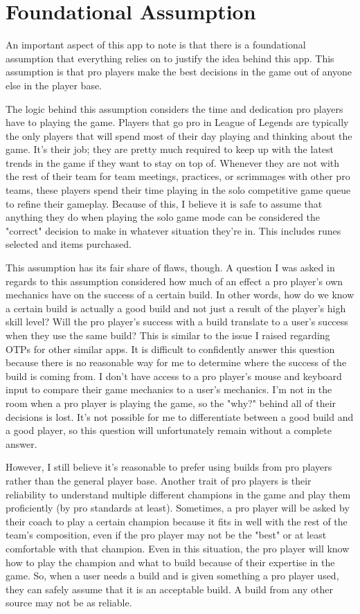 \documentclass[10pt,twocolumn]{article}
\begin{document}
\section{Foundational Assumption}
An important aspect of this app to note is that there is a foundational assumption that everything relies on to justify the idea behind this app.
This assumption is that pro players make the best decisions in the game out of anyone else in the player base.

The logic behind this assumption considers the time and dedication pro players have to playing the game.
Players that go pro in League of Legends are typically the only players that will spend most of their day playing and thinking about the game\cite{KSLNewsFPX}.
It's their job; they are pretty much required to keep up with the latest trends in the game if they want to stay on top of.
Whenever they are not with the rest of their team for team meetings, practices, or scrimmages with other pro teams, these players spend their time playing in the solo competitive game queue to refine their gameplay.
Because of this, I believe it is safe to assume that anything they do when playing the solo game mode can be considered the "correct" decision to make in whatever situation they're in.
This includes runes selected and items purchased.

This assumption has its fair share of flaws, though.
A question I was asked in regards to this assumption considered how much of an effect a pro player's own mechanics have on the success of a certain build.
In other words, how do we know a certain build is actually a good build and not just a result of the player's high skill level?
Will the pro player's success with a build translate to a user's success when they use the same build?
This is similar to the issue I raised regarding OTPs for other similar apps.
It is difficult to confidently answer this question because there is no reasonable way for me to determine where the success of the build is coming from.
I don't have access to a pro player's mouse and keyboard input to compare their game mechanics to a user's mechanics.
I'm not in the room when a pro player is playing the game, so the "why?" behind all of their decisions is lost.
It's not possible for me to differentiate between a good build and a good player, so this question will unfortunately remain without a complete answer.

However, I still believe it's reasonable to prefer using builds from pro players rather than the general player base.
Another trait of pro players is their reliability to understand multiple different champions in the game and play them proficiently (by pro standards at least).
Sometimes, a pro player will be asked by their coach to play a certain champion because it fits in well with the rest of the team's composition, even if the pro player may not be the "best" or at least comfortable with that champion.
Even in this situation, the pro player will know how to play the champion and what to build because of their expertise in the game.
So, when a user needs a build and is given something a pro player used, they can safely assume that it is an acceptable build.
A build from any other source may not be as reliable.
\end{document}
